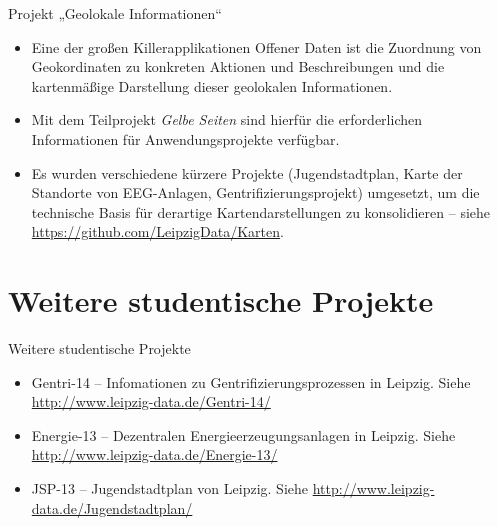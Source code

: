 \documentclass{beamer}
\begin{document}
\begin{frame}{Projekt „Geolokale Informationen“}{}\small
\begin{itemize}
  \item Eine der großen Killerapplikationen Offener Daten ist die Zuordnung von
    Geokordinaten zu konkreten Aktionen und Beschreibungen und die kartenmäßige
    Darstellung dieser geolokalen Informationen.
  \item Mit dem Teilprojekt \emph{Gelbe Seiten} sind hierfür die erforderlichen
    Informationen für Anwendungsprojekte verfügbar.
  \item Es wurden verschiedene kürzere Projekte (Jugendstadtplan, Karte der
    Standorte von EEG-Anlagen, Gentrifizierungsprojekt) umgesetzt, um die
    technische Basis für derartige Kartendarstellungen zu konsolidieren --
    siehe \url{https://github.com/LeipzigData/Karten}.
\end{itemize}
\end{frame}

\section{Weitere studentische Projekte}
\begin{frame}{Weitere studentische Projekte}{}\small
  \begin{itemize}
  \item Gentri-14 -- Infomationen zu Gentrifizierungsprozessen in Leipzig.
    Siehe \url{http://www.leipzig-data.de/Gentri-14/}
  \item Energie-13 -- Dezentralen Energieerzeugungsanlagen in Leipzig.  Siehe
    \url{http://www.leipzig-data.de/Energie-13/}
  \item JSP-13 -- Jugendstadtplan von Leipzig.  Siehe
    \url{http://www.leipzig-data.de/Jugendstadtplan/}
  \end{itemize}
\end{frame}
\end{document}

